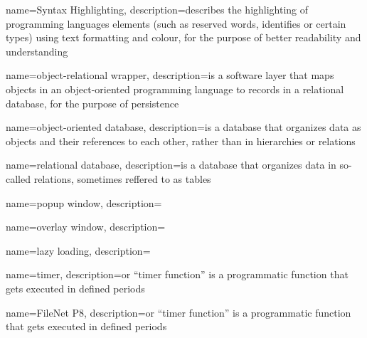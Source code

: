
{
	name=Syntax Highlighting,
	description={describes the highlighting of programming languages elements (such as reserved words, identifies or certain types) using text formatting and colour, for the purpose of better readability and understanding}
}

{
	name=object-relational wrapper,
	description={is a software layer that maps objects in an object-oriented programming language to records in a relational database, for the purpose of persistence}
}

{
	name=object-oriented database,
	description={is a database that organizes data as objects and their references to each other, rather than in hierarchies or relations}
}

{
	name=relational database,
	description={is a database that organizes data in so-called relations, sometimes reffered to as tables}
}

{
	name=popup window,
	description={}
}

{
	name=overlay window,
	description={}
}

{
	name=lazy loading,
	description={}
}

{
	name=timer,
	description={or ``timer function'' is a programmatic function that gets executed in defined periods}
}

{
	name=FileNet P8,
	description={or ``timer function'' is a programmatic function that gets executed in defined periods}
}
